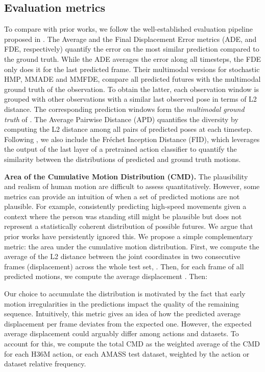 \documentclass[10pt,twocolumn,letterpaper]{article}
\begin{document}
\subsection{Evaluation metrics}
\label{subsec:evaluation_metrics} 

To compare \modelname{} with prior works, we follow the well-established evaluation pipeline proposed in \cite{yuan2020dlow}. The Average and the Final Displacement Error metrics (ADE, and FDE, respectively) quantify the error on the most similar prediction compared to the ground truth. While the ADE averages the error along all timesteps, the FDE only does it for the last predicted frame. Their multimodal versions for stochastic HMP, MMADE and MMFDE, compare all predicted futures with the multimodal ground truth of the observation. To obtain the latter, each observation window  is grouped with other observations  with a similar last observed pose in terms of L2 distance. The corresponding prediction windows  form the \textit{multimodal ground truth} of .
The Average Pairwise Distance (APD) quantifies the diversity by computing the L2 distance among all pairs of predicted poses at each timestep. Following \cite{guo2020action2motion, petrovich2021action, dang2022diverse, bie2022hitdvae}, we also include the Fréchet Inception Distance (FID), which leverages the output of the last layer of a pretrained action classifier to quantify the similarity between the distributions of predicted and ground truth motions.



\textbf{Area of the Cumulative Motion Distribution (CMD).} The plausibility and realism of human motion are difficult to assess quantitatively. However, some metrics can provide an intuition of when a set of predicted motions are not plausible. 
For example, consistently predicting high-speed movements given a context where the person was standing still might be plausible but does not represent a statistically coherent distribution of possible futures. We argue that prior works have persistently ignored this. We propose a simple complementary metric: the area under the cumulative motion distribution. First, we compute the average of the L2 distance between the joint coordinates in two consecutive frames (displacement) across the whole test set, . Then, for each frame  of all predicted motions, we compute the average displacement . Then:
\vspace{-0.25cm}
\small\normalsize

Our choice to accumulate the distribution is motivated by the fact that early motion irregularities in the predictions impact the quality of the remaining sequence. Intuitively, this metric gives an idea of how the predicted average displacement per frame deviates from the expected one. However, the expected average displacement could arguably differ among actions and datasets. To account for this, we compute the total CMD as the weighted average of the CMD for each H36M action, or each AMASS test dataset, weighted by the action or dataset relative frequency.
\end{document}
